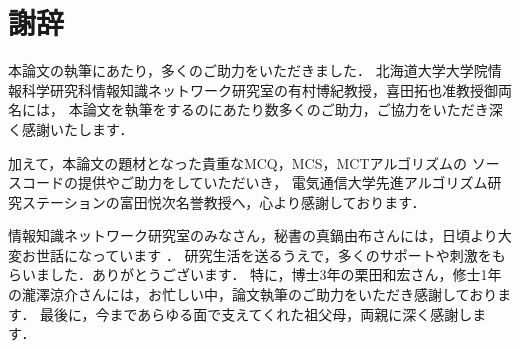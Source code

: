 
\begin{comment}
\chapter*{参考文献}
[1] MISRA, J. AND GRIES, D. 1982. Finding repeated elements. Sci. Comput. Programm. 2, p143-152.
[2] MANKU, G. AND MOTWANI, R. 2002. Approximate frequency counts over data streams. In Proceedings of the International Conference on Very Large Data Bases. p346-357.
\end{comment}

\chapter*{謝辞}
本論文の執筆にあたり，多くのご助力をいただきました．
北海道大学大学院情報科学研究科情報知識ネットワーク研究室の有村博紀教授，喜田拓也准教授御両名には，
本論文を執筆をするのにあたり数多くのご助力，ご協力をいただき深く感謝いたします．

加えて，本論文の題材となった貴重なMCQ，MCS，MCTアルゴリズムの
ソースコードの提供やご助力をしていただいき，
電気通信大学先進アルゴリズム研究ステーションの富田悦次名誉教授へ，心より感謝しております．

情報知識ネットワーク研究室のみなさん，秘書の真鍋由布さんには，日頃より大変お世話になっています
．
研究生活を送るうえで，多くのサポートや刺激をもらいました．ありがとうございます．
特に，博士3年の栗田和宏さん，修士1年の瀧澤涼介さんには，お忙しい中，論文執筆のご助力をいただき感謝しております．
最後に，今まであらゆる面で支えてくれた祖父母，両親に深く感謝します．

